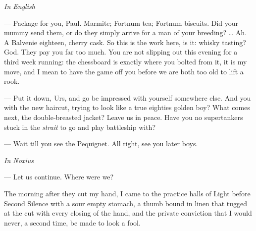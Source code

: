 
\begin{room}

\textit{In English}

--- Package for you, Paul. Marmite; Fortnum tea; Fortnum biscuits. Did your mummy send them, or do they simply arrive for a man of your breeding? \ldots{} Ah. A Balvenie eighteen, cherry cask. So this is the work here, is it: whisky tasting? God. They pay you far too much. You are not slipping out this evening for a third week running: the chessboard is exactly where you bolted from it, it is my move, and I mean to have the game off you before we are both too old to lift a rook.

--- Put it down, Urs, and go be impressed with yourself somewhere else. And you with the new haircut, trying to look like a true eighties golden boy? What comes next, the double-breasted jacket? Leave us in peace. Have you no supertankers stuck in the \textit{strait} to go and play battleship with?

--- Wait till you see the Pequignet. All right, see you later boys.

\textit{In Noxius}

--- Let us continue. Where were we?

\end{room}

The morning after they cut my hand, I came to the practice halls of Light before Second Silence with a sour empty stomach, a thumb bound in linen that tugged at the cut with every closing of the hand, and the private conviction that I would never, a second time, be made to look a fool.\par

